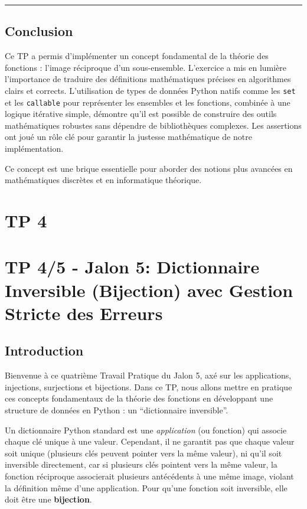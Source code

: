\documentclass[12pt,a4paper]{report}
\newcommand{\passthrough}[1]{#1}
\begin{document}
\begin{center}\rule{0.5\linewidth}{0.5pt}\end{center}

\subsection{Conclusion}\label{conclusion}

Ce TP a permis d'implémenter un concept fondamental de la théorie des
fonctions : l'image réciproque d'un sous-ensemble. L'exercice a mis en
lumière l'importance de traduire des définitions mathématiques précises
en algorithmes clairs et corrects. L'utilisation de types de données
Python natifs comme les \passthrough{\lstinline!set!} et les
\passthrough{\lstinline!callable!} pour représenter les ensembles et les
fonctions, combinée à une logique itérative simple, démontre qu'il est
possible de construire des outils mathématiques robustes sans dépendre
de bibliothèques complexes. Les assertions ont joué un rôle clé pour
garantir la justesse mathématique de notre implémentation.

Ce concept est une brique essentielle pour aborder des notions plus
avancées en mathématiques discrètes et en informatique théorique.
\newpage
\section{TP 4}
\section{TP 4/5 - Jalon 5: Dictionnaire Inversible (Bijection) avec
Gestion Stricte des
Erreurs}\label{tp-45---jalon-5-dictionnaire-inversible-bijection-avec-gestion-stricte-des-erreurs}

\subsection{Introduction}\label{introduction}

Bienvenue à ce quatrième Travail Pratique du Jalon 5, axé sur les
applications, injections, surjections et bijections. Dans ce TP, nous
allons mettre en pratique ces concepts fondamentaux de la théorie des
fonctions en développant une structure de données en Python : un
``dictionnaire inversible''.

Un dictionnaire Python standard est une \emph{application} (ou fonction)
qui associe chaque clé unique à une valeur. Cependant, il ne garantit
pas que chaque valeur soit unique (plusieurs clés peuvent pointer vers
la même valeur), ni qu'il soit inversible directement, car si plusieurs
clés pointent vers la même valeur, la fonction réciproque associerait
plusieurs antécédents à une même image, violant la définition même d'une
application. Pour qu'une fonction soit inversible, elle doit être une
\textbf{bijection}.
\end{document}
